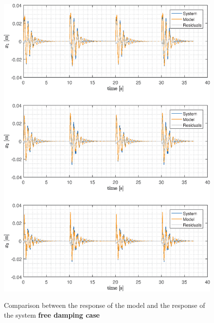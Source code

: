 \documentclass[twosided,a4paper]{article}           %
\begin{document}
\begin{figure}[H]
	\centering
	\caption{Comparison between the response of the model and the response of the system \textbf{free damping case}}
	\includegraphics[width=\linewidth]{img/compare_f}
	\label{fig:compare_f}
\end{figure} %
\end{document}
